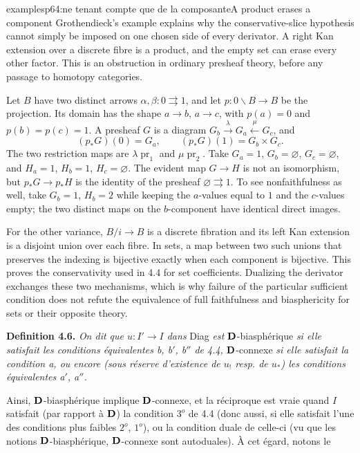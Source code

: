 \begin{dcomment}{examples}{p64:ne tenant compte que de la composante}{A product erases a component}
Grothendieck's example explains why the conservative-slice hypothesis cannot simply be imposed on one chosen side of every derivator. A right Kan extension over a discrete fibre is a product, and the empty set can erase every other factor. This is an obstruction in ordinary presheaf theory, before any passage to homotopy categories.

Let $B$ have two distinct arrows $\alpha,\beta:0\rightrightarrows1$, and let $p:0\backslash B\to B$ be the projection. Its domain has the shape $a\to b$, $a\to c$, with $p(a)=0$ and $p(b)=p(c)=1$. A presheaf $G$ is a diagram $G_b\xrightarrow{\lambda}G_a\xleftarrow{\mu}G_c$, and
\[
 (p_*G)(0)=G_a,\qquad
 (p_*G)(1)=G_b\times G_c.
\]
The two restriction maps are $\lambda\operatorname{pr}_1$ and $\mu\operatorname{pr}_2$. Take $G_a=1$, $G_b=\varnothing$, $G_c=\varnothing$, and $H_a=1$, $H_b=1$, $H_c=\varnothing$. The evident map $G\to H$ is not an isomorphism, but $p_*G\to p_*H$ is the identity of the presheaf $\varnothing\rightrightarrows1$. To see nonfaithfulness as well, take $G_b=1$, $H_b=2$ while keeping the $a$-values equal to $1$ and the $c$-values empty; the two distinct maps on the $b$-component have identical direct images.

For the other variance, $B/i\to B$ is a discrete fibration and its left Kan extension is a disjoint union over each fibre. In sets, a map between two such unions that preserves the indexing is bijective exactly when each component is bijective. This proves the conservativity used in 4.4 for set coefficients. Dualizing the derivator exchanges these two mechanisms, which is why failure of the particular sufficient condition does not refute the equivalence of full faithfulness and biasphericity for sets or their opposite theory.
\end{dcomment}



\textbf{Definition 4.6.} \textit{On dit que $u : I' \longrightarrow I$ dans} Diag \textit{est} $\mathbf{D}$-biasphérique \textit{si elle satisfait les conditions équivalentes b, b$'$, b$''$ de 4.4,} $\mathbf{D}$-connexe \textit{si elle satisfait la condition a, ou encore (sous réserve d'existence de $u_!$ resp. de $u_*$) les conditions équivalentes a$'$, a$''$.} %

Ainsi, $\mathbf{D}$-biasphérique implique $\mathbf{D}$-connexe, et la réciproque est vraie quand $I$ satisfait (par rapport à $\mathbf{D}$) la condition $3^o$ de 4.4 (donc aussi, si elle satisfait l'une des conditions plus faibles $2^o$, $1^o$), ou la condition duale de celle-ci (vu que les notions $\mathbf{D}$-biasphérique, $\mathbf{D}$-connexe sont autoduales). À cet égard, notons le

